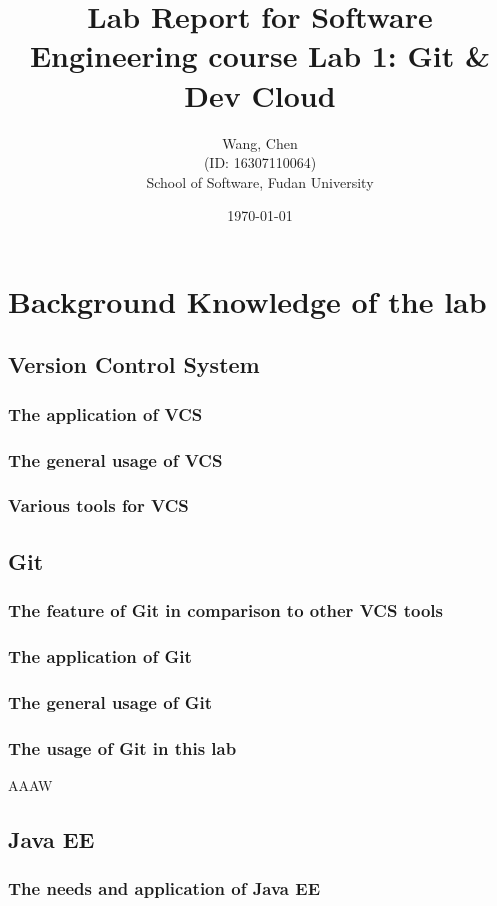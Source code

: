 \documentclass[a4paper]{report}
\title{Lab Report for Software Engineering course \newline
 Lab 1: Git \& Dev Cloud}
\author{Wang, Chen \\ (ID: 16307110064) \\ School of Software, Fudan University}
\date{\today}
\begin{document}
\maketitle

\tableofcontents

\chapter{Background Knowledge of the lab}
\section{Version Control System}
\subsection{The application of VCS}
\subsection{The general usage of VCS}
\subsection{Various tools for VCS}
\section{Git}
\subsection{The feature of Git in comparison to other VCS tools}
\subsection{The application of Git}
\subsection{The general usage of Git}
\subsection{The usage of Git in this lab}
AAAW
\section{Java EE}
\subsection{The needs and application of Java EE}
\end{document}
